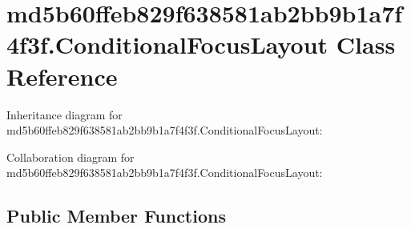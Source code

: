 \hypertarget{classmd5b60ffeb829f638581ab2bb9b1a7f4f3f_1_1_conditional_focus_layout}{}\section{md5b60ffeb829f638581ab2bb9b1a7f4f3f.\+Conditional\+Focus\+Layout Class Reference}
\label{classmd5b60ffeb829f638581ab2bb9b1a7f4f3f_1_1_conditional_focus_layout}


Inheritance diagram for md5b60ffeb829f638581ab2bb9b1a7f4f3f.\+Conditional\+Focus\+Layout\+:


Collaboration diagram for md5b60ffeb829f638581ab2bb9b1a7f4f3f.\+Conditional\+Focus\+Layout\+:
\subsection*{Public Member Functions}
